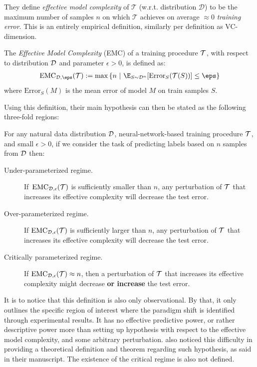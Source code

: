 They define \emph{effective model complexity} of $\mathcal{T}$ (w.r.t. distribution $\mathcal D$) to be the maximum number of samples $n$ on which $\mathcal{T}$ achieves on average $\approx 0$ \emph{training error}. This is an entirely empirical definition, similarly per definition as VC-dimension. 

\newcommand{\EMC}{\mathrm{EMC}}
\begin{definition}
The \emph{Effective Model Complexity} (EMC) of a training procedure $\mathcal{T}$, with respect to distribution $\mathcal{D}$ and parameter $\epsilon>0$,
is defined as:
\begin{align*}
    \EMC_{\cD,\eps}(\cT)
    :=  \max \left\{n ~|~ \E_{S \sim \cD^n}[ \mathrm{Error}_S( \cT( S )  ) ] \leq \eps \right\}
    \end{align*}
    where $\mathrm{Error}_S(M)$ is the mean error of model $M$ on train samples $S$.
\end{definition}

Using this definition, their main hypothesis can then be stated as the following three-fold regions:

\begin{hypothesis} \label{hyp:informaldd}
For any natural data distribution $\mathcal{D}$, neural-network-based training procedure $\mathcal{T}$, and small $\epsilon>0$,
if we consider the task of predicting labels based on  $n$ samples from $\mathcal{D}$ then:
\begin{description}
    \item[Under-parameterized regime.]  If~$\EMC_{\cD,\epsilon}(\cT)$ is sufficiently smaller than $n$, any perturbation of $\mathcal{T}$ that increases its effective complexity will decrease the test error.
    \item[Over-parameterized regime.] If $\EMC_{\cD,\epsilon}(\cT)$ is sufficiently larger than $n$,
    any perturbation of $\mathcal{T}$ that increases its effective complexity will decrease the test error.
    
    \item[Critically parameterized regime.] If $\EMC_{\cD,\epsilon}(\cT) \approx n$, then
    a perturbation of $\mathcal{T}$ that increases its effective complexity
    might decrease {\bf or increase} the test error.
\end{description}
\end{hypothesis}

It is to notice that this definition is also only observational. By that, it only outlines the specific region of interest where the paradigm shift is identified through experimental results. It has no effective predictive power, or rather descriptive power more than setting up hypothesis with respect to the effective model complexity, and some arbitrary perturbation. \cite{nakkiran_deep_2019} also noticed this difficulty in providing a theoretical definition and theorem regarding such hypothesis, as said in their manuscript. The existence of the critical regime is also not defined. 

